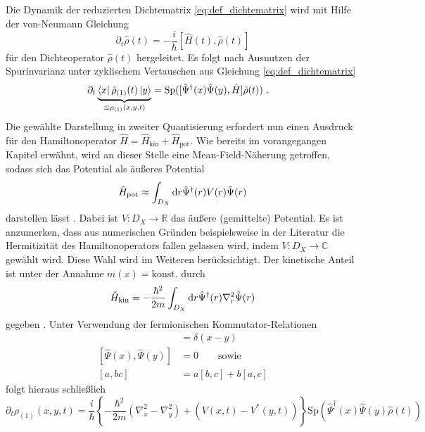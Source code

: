 \subsection{\lvn}
Die Dynamik der reduzierten Dichtematrix \eqref{eq:def_dichtematrix} wird mit Hilfe der von-Neumann Gleichung
\begin{equation*}
    \partial_t \hat{\rho}(t) = - \frac{i}{\hbar}[\hat{H}(t), \hat{\rho}(t)]
\end{equation*}
für den Dichteoperator $\hat{\rho}(t)$ hergeleitet. Es folgt nach Ausnutzen der Spurinvarianz unter zyklischem Vertauschen aus Gleichung \eqref{eq:def_dichtematrix}
\begin{align*}
  \partial_t \underbrace{\bra{x}\hat{\rho}_{(1)}(t) \ket{y}}_{\equiv \rho_{(1)}(x,y,t)} &= \text{Sp}([\hat{\Psi}^{\dagger}(x)\hat{\Psi}(y),\hat{H}]\hat{\rho}(t)) \; .
\end{align*}
Die gewählte Darstellung in zweiter Quantisierung erfordert nun einen Ausdruck für den Hamiltonoperator ${\hat{H}=\hat{H}_{\text{kin}} + \hat{H}_{\text{pot}}}$. Wie bereits im vorangegangen Kapitel erwähnt, wird an dieser Stelle eine Mean-Field-Näherung getroffen, sodass sich das Potential als äußeres Potential
\begin{equation}
    \hat{H}_{\text{pot}} \approx \int_{D_X} \mathop{}\!\mathrm{d} r \hat{\Psi}^{\dagger}(r)V(r)\hat{\Psi}(r)
    \label{eq:Hpot}
\end{equation}
darstellen lässt \cite{modern}. Dabei ist ${V: D_X \rightarrow \mathbb{R}}$ das äußere (gemittelte) Potential. Es ist anzumerken, dass aus numerischen Gründen beispielsweise in der Literatur \cite{lukas1} die Hermitizität des Hamiltonoperators fallen gelassen wird, indem ${V: D_X \rightarrow \mathbb{C}}$ gewählt wird. Diese Wahl wird im Weiteren berücksichtigt. Der kinetische Anteil ist unter der Annahme ${m(x)=\text{konst.}}$ durch
\begin{equation*}
  \hat{H}_{\text{kin}} = -\frac{\hbar^2}{2m}\int_{D_X} \mathop{}\!\mathrm{d} r \hat{\Psi}^{\dagger}(r)\nabla_r^2\hat{\Psi}(r)
\end{equation*}
gegeben \cite{modern}. Unter Verwendung der fermionischen Kommutator-Relationen   \cite{modern}
\begin{align*}
  [\hat{\Psi}(x),\hat{\Psi}^{\dagger}(y)]&=\delta(x-y) \\
  [\hat{\Psi}(x),\hat{\Psi}(y)]&=0  \qquad \text{sowie}\\
  [a,bc]&=a[b,c]+b[a,c]
\end{align*}
folgt hieraus schließlich
\begin{equation*}
  \partial_t \rho_{(1)}(x,y,t) = \frac{i}{\hbar}\left\{-\frac{\hbar^2}{2m}(\nabla_x^2 - \nabla_y^2) + (V(x,t) - V^*(y,t)) \right\}
                          \text{Sp}(\hat{\Psi}^{\dagger}(x) \hat{\Psi}(y) \hat{\rho}(t))
\end{equation*}
